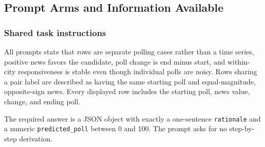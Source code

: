 \subsection{Prompt Arms and Information Available}
\label{app:coin-city-arms}

\subsubsection{Shared task instructions}
All prompts state that rows are separate polling cases rather than a time series,
positive news favors the candidate, poll change is end minus start, and
within-city responsiveness is stable even though individual polls are noisy. Rows
sharing a pair label are described as having the same starting poll and
equal-magnitude, opposite-sign news. Every displayed row includes the starting
poll, news value, change, and ending poll.

The required answer is a JSON object with exactly a one-sentence
\texttt{rationale} and a numeric \texttt{predicted\_poll} between 0 and 100. The
prompt asks for no step-by-step derivation.

